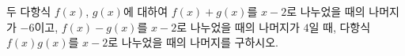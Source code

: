 두 다항식 $f(x)$, $g(x)$에 대하여 $f(x)+g(x)$를 $x-2$로 나누었을 때의 나머지가 $-6$이고, $f(x)-g(x)$를 $x-2$로 나누었을 때의 나머지가 $4$일 때, 다항식 $f(x)g(x)$를 $x-2$로 나누었을 때의 나머지를 구하시오.
